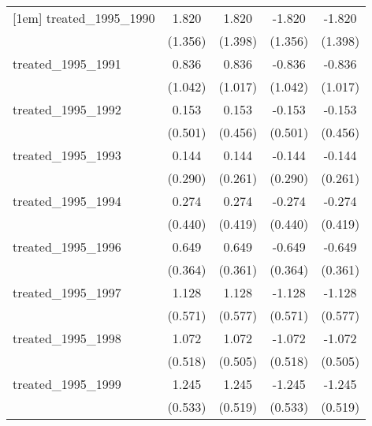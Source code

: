 {\begin{tabular}{l*{4}{c}}
[1em]
treated\_1995\_1990&       1.820         &       1.820         &      -1.820         &      -1.820         \\
            &     (1.356)         &     (1.398)         &     (1.356)         &     (1.398)         \\
[1em]
treated\_1995\_1991&       0.836         &       0.836         &      -0.836         &      -0.836         \\
            &     (1.042)         &     (1.017)         &     (1.042)         &     (1.017)         \\
[1em]
treated\_1995\_1992&       0.153         &       0.153         &      -0.153         &      -0.153         \\
            &     (0.501)         &     (0.456)         &     (0.501)         &     (0.456)         \\
[1em]
treated\_1995\_1993&       0.144         &       0.144         &      -0.144         &      -0.144         \\
            &     (0.290)         &     (0.261)         &     (0.290)         &     (0.261)         \\
[1em]
treated\_1995\_1994&       0.274         &       0.274         &      -0.274         &      -0.274         \\
            &     (0.440)         &     (0.419)         &     (0.440)         &     (0.419)         \\
[1em]
treated\_1995\_1996&       0.649         &       0.649         &      -0.649         &      -0.649         \\
            &     (0.364)         &     (0.361)         &     (0.364)         &     (0.361)         \\
[1em]
treated\_1995\_1997&       1.128\sym{*}  &       1.128         &      -1.128\sym{*}  &      -1.128         \\
            &     (0.571)         &     (0.577)         &     (0.571)         &     (0.577)         \\
[1em]
treated\_1995\_1998&       1.072\sym{*}  &       1.072\sym{*}  &      -1.072\sym{*}  &      -1.072\sym{*}  \\
            &     (0.518)         &     (0.505)         &     (0.518)         &     (0.505)         \\
[1em]
treated\_1995\_1999&       1.245\sym{*}  &       1.245\sym{*}  &      -1.245\sym{*}  &      -1.245\sym{*}  \\
            &     (0.533)         &     (0.519)         &     (0.533)         &     (0.519)         \\

\end{tabular}}
